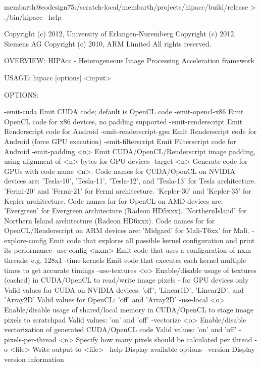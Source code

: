 \lstset{language=bash}
\begin{code}
membarth@codesign75:/scratch-local/membarth/projects/hipacc/build/release > ./bin/hipacc --help

Copyright (c) 2012, University of Erlangen-Nuremberg
Copyright (c) 2012, Siemens AG
Copyright (c) 2010, ARM Limited
All rights reserved.

OVERVIEW: HIPAcc - Heterogeneous Image Processing Acceleration framework

USAGE:  hipacc [options] <input>

OPTIONS:

  -emit-cuda              Emit CUDA code; default is OpenCL code
  -emit-opencl-x86        Emit OpenCL code for x86 devices, no padding supported
  -emit-renderscript      Emit Renderscript code for Android
  -emit-renderscript-gpu  Emit Renderscript code for Android (force GPU execution)
  -emit-filterscript      Emit Filterscript code for Android
  -emit-padding <n>       Emit CUDA/OpenCL/Renderscript image padding, using alignment of <n> bytes for GPU devices
  -target <n>             Generate code for GPUs with code name <n>.
                          Code names for CUDA/OpenCL on NVIDIA devices are:
                            'Tesla-10', 'Tesla-11', 'Tesla-12', and 'Tesla-13' for Tesla architecture.
                            'Fermi-20' and 'Fermi-21' for Fermi architecture.
                            'Kepler-30' and 'Kepler-35' for Kepler architecture.
                          Code names for for OpenCL on AMD devices are:
                            'Evergreen'      for Evergreen architecture (Radeon HD5xxx).
                            'NorthernIsland' for Northern Island architecture (Radeon HD6xxx).
                          Code names for for OpenCL/Renderscript on ARM devices are:
                            'Midgard' for Mali-T6xx' for Mali.
  -explore-config         Emit code that explores all possible kernel configuration and print its performance
  -use-config <nxm>       Emit code that uses a configuration of nxm threads, e.g. 128x1
  -time-kernels           Emit code that executes each kernel multiple times to get accurate timings
  -use-textures <o>       Enable/disable usage of textures (cached) in CUDA/OpenCL to read/write image pixels - for GPU devices only
                          Valid values for CUDA on NVIDIA devices: 'off', 'Linear1D', 'Linear2D', and 'Array2D'
                          Valid values for OpenCL: 'off' and 'Array2D'
  -use-local <o>          Enable/disable usage of shared/local memory in CUDA/OpenCL to stage image pixels to scratchpad
                          Valid values: 'on' and 'off'
  -vectorize <o>          Enable/disable vectorization of generated CUDA/OpenCL code
                          Valid values: 'on' and 'off'
  -pixels-per-thread <n>  Specify how many pixels should be calculated per thread
  -o <file>               Write output to <file>
  --help                  Display available options
  --version               Display version information
\end{code}


